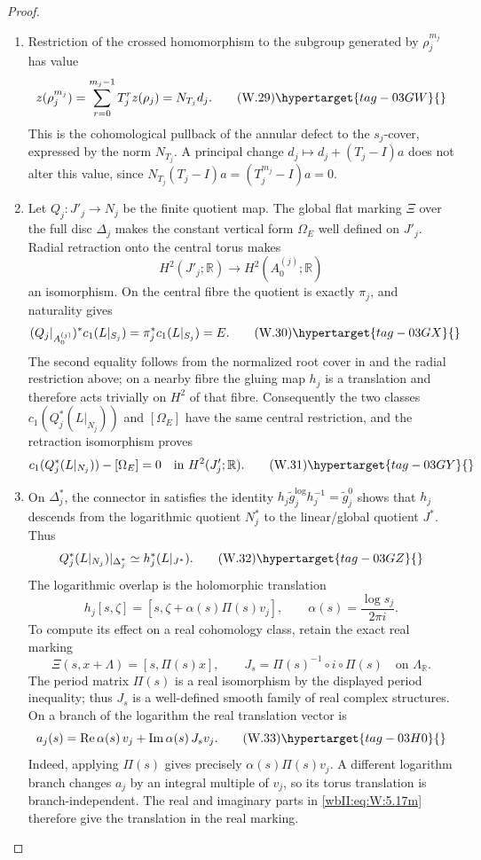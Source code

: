 \begin{proof}

\begin{enumerate}[label=\arabic*.,leftmargin=*]
\item Restriction of the crossed homomorphism to the subgroup generated by
$\rho_j^{m_j}$ has value
\[
 z(\rho_j^{m_j})
 =\sum_{r=0}^{m_j-1}T_j^rz(\rho_j)=N_{T_j}d_j.
\tag{W.29}\hypertarget{tag-03GW}{}\label{wbII:eq:W:5.17l}
\]
This is the cohomological pullback of the annular defect to the
$s_j$-cover, expressed by the norm $N_{T_j}$.  A principal change
$d_j\mapsto d_j+(T_j-I)a$ does not alter this value, since
$N_{T_j}(T_j-I)a=(T_j^{m_j}-I)a=0$.

\item Let $Q_j:J'_j\to N_j$ be the finite quotient map.  The global flat marking
$\Xi$ over the full disc $\Delta_j$ makes the constant vertical form
$\Omega_E$ well defined on $J'_j$.  Radial retraction onto the central
torus makes
\[
 H^2(J'_j;\mathbb R)\longrightarrow H^2(A_0^{(j)};\mathbb R)
\]
an isomorphism.  On the central fibre the quotient is exactly $\pi_j$, and
naturality gives
\[
 (Q_j|_{A_0^{(j)}})^*c_1(L|_{S_j})
 =\pi_j^*c_1(L|_{S_j})=E.
\tag{W.30}\hypertarget{tag-03GX}{}\label{wbII:eq:W:5.17l'}
\]
The second equality follows from the normalized root cover in
 and the radial restriction above; on a nearby fibre the gluing map $h_j$
is a translation and therefore acts trivially on $H^2$ of that fibre.
Consequently the two classes
$c_1(Q_j^*(L|_{N_j}))$ and $[\Omega_E]$ have the same central restriction,
and the retraction isomorphism proves
\[
 c_1(Q_j^*(L|_{N_j}))-[\Omega_E]=0
 \quad\text{in }H^2(J'_j;\mathbb R).
\tag{W.31}\hypertarget{tag-03GY}{}\label{wbII:eq:W:5.17l''}
\]

\item On $\Delta_j^*$, the connector in
 satisfies the identity
$h_j\widetilde g_j^{\log}h_j^{-1}=\widetilde g_j^0$ shows that $h_j$
descends from the logarithmic quotient $N_j^*$ to the linear/global
quotient $J^*$.  Thus
\[
 Q_j^*(L|_{N_j})|_{\Delta_j^*}
 \simeq h_j^*(L|_{J^*}).
\tag{W.32}\hypertarget{tag-03GZ}{}\label{wbII:eq:W:5.17l'''}
\]
The logarithmic overlap is the holomorphic translation
\[
 h_j[s,\zeta]=[s,\zeta+\alpha(s)\Pi(s)v_j],
 \qquad \alpha(s)=\frac{\log s_j}{2\pi i}.
\]
To compute its effect on a real cohomology class, retain the exact
real marking
\[
 \Xi(s,x+\Lambda)=[s,\Pi(s)x],\qquad
 J_s=\Pi(s)^{-1}\circ i\circ\Pi(s)
 \quad\text{on }\Lambda_{\mathbb R}.
\]
The period matrix \(\Pi(s)\) is a real isomorphism by the displayed period inequality;
thus \(J_s\) is a well-defined smooth family of real complex
structures.  On a branch of the logarithm the real
translation vector is
\[
 a_j(s)=\operatorname{Re}\alpha(s)\,v_j+
        \operatorname{Im}\alpha(s)\,J_s v_j.
 \tag{W.33}\hypertarget{tag-03H0}{}\label{wbII:eq:W:5.17m}
\]
Indeed, applying \(\Pi(s)\) gives precisely
\(\alpha(s)\Pi(s)v_j\).  A different logarithm branch changes
\(a_j\) by an integral multiple of \(v_j\), so its torus translation
is branch-independent.  The real and imaginary parts in \eqref{wbII:eq:W:5.17m} therefore give
the translation in the real marking.


\end{enumerate}
\end{proof}
